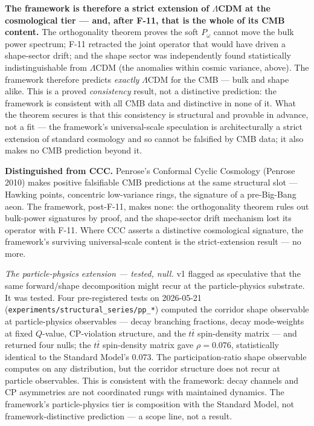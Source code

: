 \documentclass[11pt,a4paper]{article}
\newcommand{\Pomega}{P_{\omega}}
\begin{document}
\textbf{The framework is therefore a strict extension of $\Lambda$CDM at the cosmological tier --- and, after F-11, that is the whole of its CMB content.} The orthogonality theorem proves the soft $\Pomega$ cannot move the bulk power spectrum; F-11 retracted the joint operator that would have driven a shape-sector drift; and the shape sector was independently found statistically indistinguishable from $\Lambda$CDM (the anomalies within cosmic variance, above). The framework therefore predicts \emph{exactly} $\Lambda$CDM for the CMB --- bulk and shape alike. This is a proved \emph{consistency} result, not a distinctive prediction: the framework is consistent with all CMB data and distinctive in none of it. What the theorem secures is that this consistency is structural and provable in advance, not a fit --- the framework's universal-scale speculation is architecturally a strict extension of standard cosmology and so cannot be falsified by CMB data; it also makes no CMB prediction beyond it.

\textbf{Distinguished from CCC.} Penrose's Conformal Cyclic Cosmology (Penrose 2010) makes positive falsifiable CMB predictions at the same structural slot --- Hawking points, concentric low-variance rings, the signature of a pre-Big-Bang aeon. The framework, post-F-11, makes none: the orthogonality theorem rules out bulk-power signatures by proof, and the shape-sector drift mechanism lost its operator with F-11. Where CCC asserts a distinctive cosmological signature, the framework's surviving universal-scale content is the strict-extension result --- no more.

\emph{The particle-physics extension --- tested, null.} v1 flagged as speculative that the same forward/shape decomposition might recur at the particle-physics substrate. It was tested. Four pre-registered tests on 2026-05-21 (\texttt{experiments/structural\_series/pp\_*}) computed the corridor shape observable at particle-physics observables --- decay branching fractions, decay mode-weights at fixed $Q$-value, CP-violation structure, and the $t\bar{t}$ spin-density matrix --- and returned four nulls; the $t\bar{t}$ spin-density matrix gave $\rho = 0.076$, statistically identical to the Standard Model's $0.073$. The participation-ratio shape observable computes on any distribution, but the corridor structure does not recur at particle observables. This is consistent with the framework: decay channels and CP asymmetries are not coordinated rungs with maintained dynamics. The framework's particle-physics tier is composition with the Standard Model, not framework-distinctive prediction --- a scope line, not a result.
\end{document}
